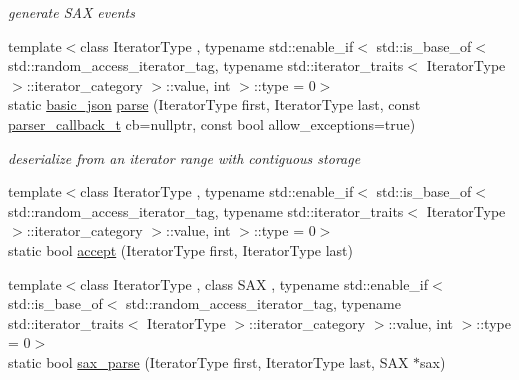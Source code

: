 \begin{DoxyCompactItemize}
\begin{DoxyCompactList}\small\item\em generate S\+AX events \end{DoxyCompactList}\item 
{\footnotesize template$<$class Iterator\+Type , typename std\+::enable\+\_\+if$<$ std\+::is\+\_\+base\+\_\+of$<$ std\+::random\+\_\+access\+\_\+iterator\+\_\+tag, typename std\+::iterator\+\_\+traits$<$ Iterator\+Type $>$\+::iterator\+\_\+category $>$\+::value, int $>$\+::type  = 0$>$ }\\static \hyperlink{classnlohmann_1_1basic__json}{basic\+\_\+json} \hyperlink{classnlohmann_1_1basic__json_ab330c13ba254ea41fbc1c52c5c610f45}{parse} (Iterator\+Type first, Iterator\+Type last, const \hyperlink{classnlohmann_1_1basic__json_ab4f78c5f9fd25172eeec84482e03f5b7}{parser\+\_\+callback\+\_\+t} cb=nullptr, const bool allow\+\_\+exceptions=true)
\begin{DoxyCompactList}\small\item\em deserialize from an iterator range with contiguous storage \end{DoxyCompactList}\item 
{\footnotesize template$<$class Iterator\+Type , typename std\+::enable\+\_\+if$<$ std\+::is\+\_\+base\+\_\+of$<$ std\+::random\+\_\+access\+\_\+iterator\+\_\+tag, typename std\+::iterator\+\_\+traits$<$ Iterator\+Type $>$\+::iterator\+\_\+category $>$\+::value, int $>$\+::type  = 0$>$ }\\static bool \hyperlink{classnlohmann_1_1basic__json_ae797958b922732bf5fc01053d0659c1f}{accept} (Iterator\+Type first, Iterator\+Type last)
\item 
{\footnotesize template$<$class Iterator\+Type , class S\+AX , typename std\+::enable\+\_\+if$<$ std\+::is\+\_\+base\+\_\+of$<$ std\+::random\+\_\+access\+\_\+iterator\+\_\+tag, typename std\+::iterator\+\_\+traits$<$ Iterator\+Type $>$\+::iterator\+\_\+category $>$\+::value, int $>$\+::type  = 0$>$ }\\static bool \hyperlink{classnlohmann_1_1basic__json_aab9d7f0843a6e8f18eb2ebb944a796bd}{sax\+\_\+parse} (Iterator\+Type first, Iterator\+Type last, S\+AX $\ast$sax)
\end{DoxyCompactItemize}

